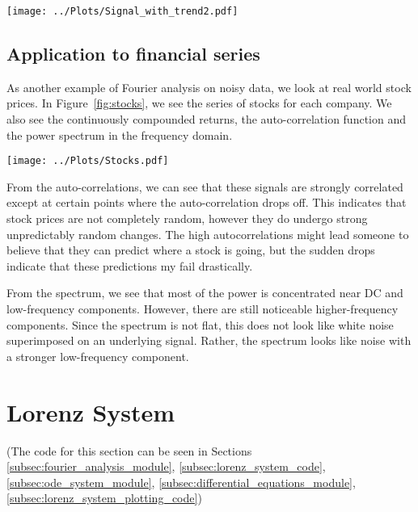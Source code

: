 \documentclass[twocolumn]{myarticle}
\begin{document}
\begin{figure*}[htb]
    \centering
    \texttt{[image: ../Plots/Signal\_with\_trend2.pdf]}
    \caption{Noise removed from a signal with a trend. This time the trend was removed before the noise was removed, and then added back in later.}
    \label{fig:signal_with_trend2}
\end{figure*}

\subsection{Application to financial series}
\label{subsec:application_to_financial_series}

As another example of Fourier analysis on noisy data, we look at real world stock prices.
In Figure~\ref{fig:stocks}, we see the series of stocks for each company.
We also see the continuously compounded returns, the auto-correlation function and the power spectrum in the frequency domain.

\begin{figure*}[htb]
    \centering
    \texttt{[image: ../Plots/Stocks.pdf]}
    \caption{Analysis of real world stock prices.}
    \label{fig:stocks}
\end{figure*}

From the auto-correlations, we can see that these signals are strongly correlated except at certain points where the auto-correlation drops off.
This indicates that stock prices are not completely random, however they do undergo strong unpredictably random changes.
The high autocorrelations might lead someone to believe that they can predict where a stock is going, but the sudden drops indicate that these predictions my fail drastically.

From the spectrum, we see that most of the power is concentrated near DC and low-frequency components.
However, there are still noticeable higher-frequency components.
Since the spectrum is not flat, this does not look like white noise superimposed on an underlying signal.
Rather, the spectrum looks like noise with a stronger low-frequency component.

\section{Lorenz System}

(The code for this section can be seen in Sections \ref{subsec:fourier_analysis_module}, \ref{subsec:lorenz_system_code}, \ref{subsec:ode_system_module}, \ref{subsec:differential_equations_module}, \ref{subsec:lorenz_system_plotting_code})
\end{document}
